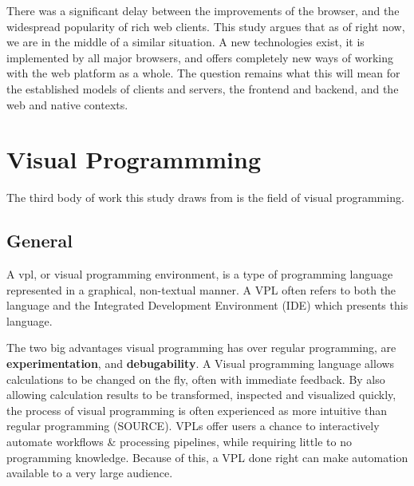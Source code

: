 There was a significant delay between the improvements of the browser, and the widespread popularity of rich web clients. 
This study argues that as of right now, we are in the middle of a similar situation. 
A new technologies exist, it is implemented by all major browsers, and offers completely new ways of working with the web platform as a whole. 
The question remains what this will mean for the established models of clients and servers, the frontend and backend, and the web and native contexts. 

\section{Visual Programmming}
\label{sec:background-vpl}

The third body of work this study draws from is the field of visual programming. 


\subsection{General}


A \ac{vpl}, or visual programming environment, is a type of programming language represented in a graphical, non-textual manner.
A VPL often refers to both the language and the Integrated Development Environment (IDE) which presents this language.

The two big advantages visual programming has over regular programming, are \textbf{experimentation}, and \textbf{debugability}.
A Visual programming language allows calculations to be changed on the fly, often with immediate feedback. By also allowing calculation results to be transformed, inspected and visualized quickly, the process of visual programming is often experienced as more intuitive than regular programming (SOURCE).
VPLs offer users a chance to interactively automate workflows \& processing pipelines, while requiring little to no programming knowledge. 
Because of this, a VPL done right can make automation available to a very large audience.

